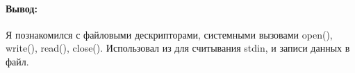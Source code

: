 \paragraph{Вывод:}
Я познакомился с файловыми дескрипторами, системными вызовами open(), write(), read(), close().
Использовал из для считывания stdin, и записи данных в файл.